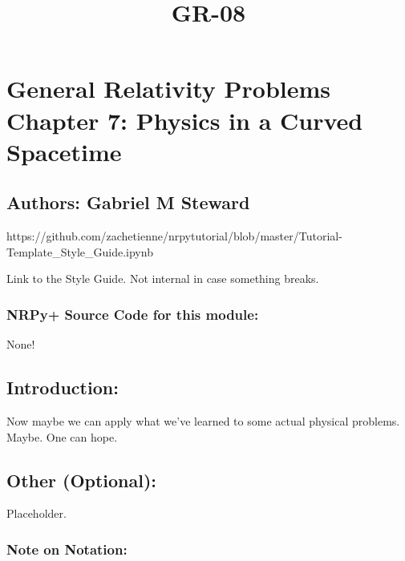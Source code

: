 \documentclass[landscape,letterpaper,10pt,english]{article}
\title{GR-08}
\begin{document}
    
    \maketitle
    
    

    
    \hypertarget{general-relativity-problems-chapter-7-physics-in-a-curved-spacetime}{%
\section{General Relativity Problems Chapter 7: Physics in a Curved
Spacetime}\label{general-relativity-problems-chapter-7-physics-in-a-curved-spacetime}}

\hypertarget{authors-gabriel-m-steward}{%
\subsection{Authors: Gabriel M
Steward}\label{authors-gabriel-m-steward}}

    https://github.com/zachetienne/nrpytutorial/blob/master/Tutorial-Template\_Style\_Guide.ipynb

Link to the Style Guide. Not internal in case something breaks.

    \hypertarget{nrpy-source-code-for-this-module}{%
\subsubsection{\texorpdfstring{ NRPy+ Source Code for this
module:}{ NRPy+ Source Code for this module:}}\label{nrpy-source-code-for-this-module}}

None!

\hypertarget{introduction}{%
\subsection{Introduction:}\label{introduction}}

Now maybe we can apply what we've learned to some actual physical
problems. Maybe. One can hope.

\hypertarget{other-optional}{%
\subsection{\texorpdfstring{ Other
(Optional):}{ Other (Optional):}}\label{other-optional}}

Placeholder.

\hypertarget{note-on-notation}{%
\subsubsection{Note on Notation:}\label{note-on-notation}}
\end{document}
